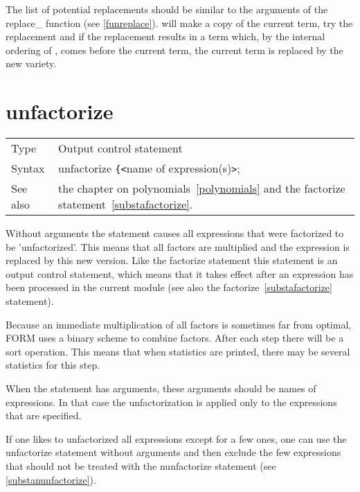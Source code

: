 \noindent The list of potential replacements should be 
similar to the arguments of the replace\_ 
function (see \ref{funreplace}). {\FORM} will 
make a copy of the current term, try the replacement and if the replacement 
results in a term which, by the internal ordering of {\FORM}, comes before 
the current term, the current term is replaced by the new variety. 
\vspace{10mm}


\section{unfactorize}
\label{substaunfactorize}

\noindent \begin{tabular}{ll}
Type & Output control statement\\
Syntax & unfactorize \verb:{:{\tt<}name of expression(s){\tt>};
\\ See also & the chapter on polynomials~\ref{polynomials} and the 
factorize statement~\ref{substafactorize}.
\end{tabular} \vspace{4mm}

\noindent Without arguments the statement causes all expressions that were 
factorized to be 'unfactorized'. This means that all factors are multiplied 
and the expression is replaced by this new version. Like the factorize 
statement this statement is an output control statement, which means that 
it takes effect after an expression has been processed in the current 
module (see also the factorize~\ref{substafactorize} statement).

\noindent Because an immediate multiplication of all factors is sometimes 
far from optimal, FORM uses a binary scheme to combine factors. After each 
step there will be a sort operation. This means that when statistics are 
printed, there may be several statistics for this step.

\noindent When the statement has arguments, these arguments should be names 
of expressions. In that case the unfactorization is applied only to the 
expressions that are specified.

\noindent If one likes to unfactorized all expressions except for a few 
ones, one can use the unfactorize statement without arguments and then 
exclude the few expressions that should not be treated with the 
nunfactorize statement (see \ref{substanunfactorize}).
\vspace{10mm} 

